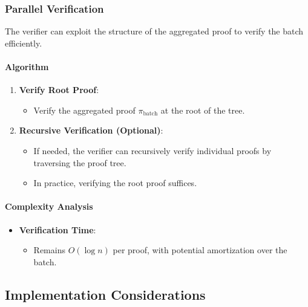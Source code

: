\documentclass{article}
\theoremstyle{plain}
\theoremstyle{definition}
\theoremstyle{remark}
\theoremstyle{problem}
\begin{document}
\subsubsection{Parallel Verification}

The verifier can exploit the structure of the aggregated proof to verify the batch efficiently.

\paragraph{Algorithm}

\begin{enumerate}
    \item \textbf{Verify Root Proof}:

    \begin{itemize}
        \item Verify the aggregated proof $\pi_{\text{batch}}$ at the root of the tree.
    \end{itemize}

    \item \textbf{Recursive Verification (Optional)}:

    \begin{itemize}
        \item If needed, the verifier can recursively verify individual proofs by traversing the proof tree.
        \item In practice, verifying the root proof suffices.
    \end{itemize}
\end{enumerate}

\paragraph{Complexity Analysis}

\begin{itemize}
    \item \textbf{Verification Time}:

    \begin{itemize}
        \item Remains $O(\log n)$ per proof, with potential amortization over the batch.
    \end{itemize}
\end{itemize}

\subsection{Implementation Considerations}
\end{document}
